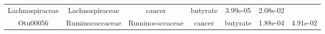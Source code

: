 \documentclass[11pt,]{article}
\begin{document}
\begin{longtable}[]{@{}ccccccc@{}}
\begin{minipage}[t]{0.17\columnwidth}
Lachnospiraceae\strut
\end{minipage} & \begin{minipage}[t]{0.17\columnwidth}\centering\strut
Lachnospiraceae\strut
\end{minipage} & \begin{minipage}[t]{0.09\columnwidth}\centering\strut
cancer\strut
\end{minipage} & \begin{minipage}[t]{0.11\columnwidth}\centering\strut
butyrate\strut
\end{minipage} & \begin{minipage}[t]{0.09\columnwidth}\centering\strut
3.99e-05\strut
\end{minipage} & \begin{minipage}[t]{0.09\columnwidth}\centering\strut
2.08e-02\strut
\end{minipage}\tabularnewline
\begin{minipage}[t]{0.09\columnwidth}\centering\strut
Otu00056\strut
\end{minipage} & \begin{minipage}[t]{0.17\columnwidth}\centering\strut
Ruminococcaceae\strut
\end{minipage} & \begin{minipage}[t]{0.17\columnwidth}\centering\strut
Ruminococcaceae\strut
\end{minipage} & \begin{minipage}[t]{0.09\columnwidth}\centering\strut
cancer\strut
\end{minipage} & \begin{minipage}[t]{0.11\columnwidth}\centering\strut
butyrate\strut
\end{minipage} & \begin{minipage}[t]{0.09\columnwidth}\centering\strut
1.88e-04\strut
\end{minipage} & \begin{minipage}[t]{0.09\columnwidth}\centering\strut
4.91e-02\strut
\end{minipage}\tabularnewline
\bottomrule
\end{longtable}

\normalsize
\end{document}
